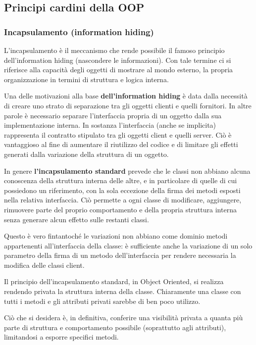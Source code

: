 \subsection{Principi cardini della OOP}

\subsubsection{Incapsulamento (information hiding)}
L'incapsulamento è il meccanismo che rende possibile il famoso principio dell'information hiding (nascondere le informazioni). Con tale termine ci si riferisce alla capacità degli oggetti di mostrare al mondo esterno, la propria organizzazione in termini di struttura e logica interna.

Una delle motivazioni alla base \textbf{dell'information hiding} è data dalla necessità di creare uno strato di separazione tra gli oggetti clienti e quelli fornitori. In altre parole è necessario separare l'interfaccia propria di un oggetto dalla sua implementazione interna. In sostanza l'interfaccia (anche se implicita) rappresenta il contratto stipulato tra gli oggetti client e quelli server. Ciò è vantaggioso al fine di aumentare il riutilizzo del codice e di limitare gli effetti generati dalla variazione della struttura di un oggetto.

In genere \textbf{l'incapsulamento standard} prevede che le classi non abbiano alcuna conoscenza della struttura interna delle altre, e in particolare di quelle di cui possiedono un riferimento, con la sola eccezione della firma dei metodi esposti nella relativa interfaccia. Ciò permette a ogni classe di modificare, aggiungere, rimuovere parte del proprio comportamento e della propria struttura interna senza generare alcun effetto sulle restanti classi.

Questo è vero fintantoché le variazioni non abbiano come dominio metodi appartenenti all'interfaccia della classe: è sufficiente anche la variazione di un solo parametro della firma di un metodo dell'interfaccia per rendere necessaria la modifica delle classi client.

Il principio dell'incapsulamento standard, in Object Oriented, si realizza rendendo privata la struttura interna della classe. Chiaramente una classe con tutti i metodi e gli attributi privati sarebbe di ben poco utilizzo.

Ciò che si desidera è, in definitiva, conferire una visibilità privata a quanta più parte di struttura e comportamento possibile (soprattutto agli attributi), limitandosi a esporre specifici metodi.
